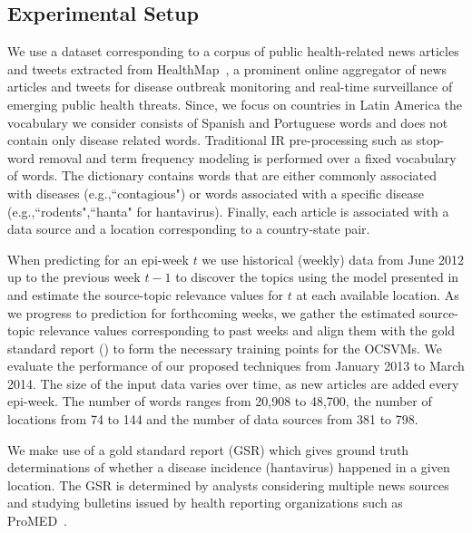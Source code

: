 \documentclass[conference]{IEEEtran}
\begin{document}

\subsection{Experimental Setup}
 We use a dataset corresponding to a corpus of public health-related news articles and tweets extracted from HealthMap~\cite{healthmap}, a prominent online aggregator of news articles and tweets for disease outbreak monitoring and real-time surveillance of emerging public health threats. Since, we focus on countries in Latin America the vocabulary we consider consists of Spanish and Portuguese words and does not contain only disease related words. Traditional IR pre-processing such as stop-word removal and term frequency modeling is performed over a fixed vocabulary of words. The dictionary contains words that are either commonly associated with diseases (e.g.,``contagious") or words associated with a specific disease (e.g.,``rodents",``hanta" for hantavirus). Finally, each article is associated with a data source and a location corresponding to a country-state pair.

When predicting for an epi-week $t$ we use historical (weekly) data from June 2012 up to the previous week $t-1$ to discover the topics using the model presented in  and estimate the source-topic relevance values for $t$ at each available location. As we progress to prediction for forthcoming weeks, we gather the estimated source-topic relevance values corresponding to past weeks and align them with the gold standard report () to  form the necessary training points for the OCSVMs. We evaluate the performance of our proposed techniques from January 2013 to March 2014. The size of the input data varies over time, as new articles are added every epi-week. The number of words ranges from 20,908 to 48,700, the number of locations from 74 to 144 and the number of data sources from 381 to 798.

 We make use of a gold standard report (GSR) which gives ground truth determinations of whether a disease incidence (hantavirus) happened in a given location. The GSR is determined by analysts considering multiple news sources and studying bulletins issued by health reporting organizations such as ProMED~\cite{probmed}.
\end{document}
